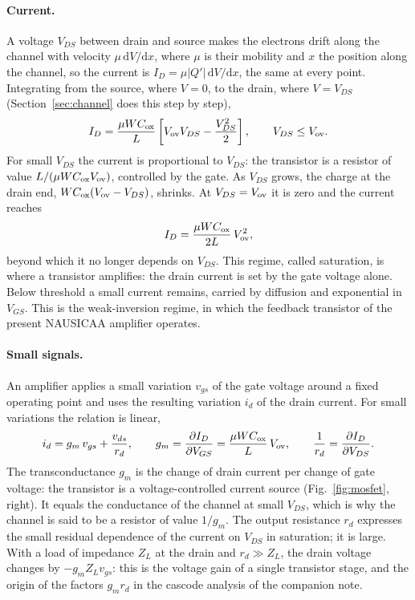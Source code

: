 \documentclass[11pt,a4paper]{article}
\newcommand{\dd}{\mathrm{d}}
\begin{document}
\paragraph{Current.} A voltage $V_{DS}$ between drain and source makes the
electrons drift along the channel with velocity $\mu\,\dd V/\dd x$, where
$\mu$ is their mobility and $x$ the position along the channel, so the
current is $I_D=\mu|Q'|\,\dd V/\dd x$, the same at every point. Integrating
from the source, where $V=0$, to the drain, where $V=V_{DS}$
(Section~\ref{sec:channel} does this step by step),
%
\[
 I_D = \frac{\mu WC_{\rm ox}}{L}\left[V_{\rm ov}V_{DS}-\frac{V_{DS}^2}{2}\right],
 \qquad V_{DS}\le V_{\rm ov} .
\]
%
For small $V_{DS}$ the current is proportional to $V_{DS}$: the transistor is
a resistor of value $L/(\mu WC_{\rm ox}V_{\rm ov})$, controlled by the gate.
As $V_{DS}$ grows, the charge at the drain end, $WC_{\rm ox}(V_{\rm
ov}-V_{DS})$, shrinks. At $V_{DS}=V_{\rm ov}$ it is zero and the current
reaches
%
\[
 I_D = \frac{\mu WC_{\rm ox}}{2L}\,V_{\rm ov}^2 ,
\]
%
beyond which it no longer depends on $V_{DS}$. This regime, called
saturation, is where a transistor amplifies: the drain current is set by the
gate voltage alone. Below threshold a small current remains, carried by
diffusion and exponential in $V_{GS}$. This is the weak-inversion regime, in
which the feedback transistor of the present NAUSICAA amplifier operates.

\paragraph{Small signals.} An amplifier applies a small variation $v_{gs}$
of the gate voltage around a fixed operating point and uses the resulting
variation $i_d$ of the drain current. For small variations the relation is
linear,
%
\[
 i_d = g_m\,v_{gs} + \frac{v_{ds}}{r_d},
 \qquad
 g_m=\frac{\partial I_D}{\partial V_{GS}}=\frac{\mu WC_{\rm ox}}{L}\,V_{\rm ov},
 \qquad
 \frac{1}{r_d}=\frac{\partial I_D}{\partial V_{DS}} .
\]
%
The transconductance $g_m$ is the change of drain current per change of gate
voltage: the transistor is a voltage-controlled current source
(Fig.~\ref{fig:mosfet}, right). It equals the conductance of the channel at
small $V_{DS}$, which is why the channel is said to be a resistor of value
$1/g_m$. The output resistance $r_d$ expresses the small residual dependence
of the current on $V_{DS}$ in saturation; it is large. With a load of
impedance $Z_L$ at the drain and $r_d\gg Z_L$, the drain voltage changes by
$-g_mZ_Lv_{gs}$: this is the voltage gain of a single transistor stage, and
the origin of the factors $g_mr_d$ in the cascode analysis of the companion
note.
\end{document}
